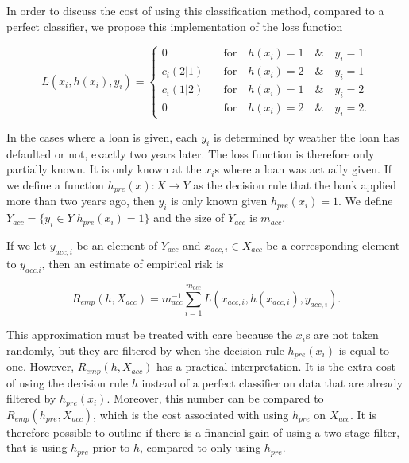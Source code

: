 \documentclass{article}
\theoremstyle{theorem}
\theoremstyle{definition}
\begin{document}
In order to discuss the cost of using this classification method, compared to a perfect classifier, we propose this implementation of the loss function

\begin{equation}
\label{def:empRiskBank}
L(x_i, h(x_i), y_i) = 
\begin{cases}
0     &\quad \mbox{for} \quad h(x_i) = 1 \quad \& \quad y_i = 1\\
c_i(2|1)    &\quad \mbox{for} \quad h(x_i) = 2 \quad \& \quad y_i = 1\\
c_i(1|2)      &\quad \mbox{for} \quad h(x_i) = 1 \quad \& \quad y_i = 2\\
0   &\quad \mbox{for} \quad h(x_i) = 2 \quad \& \quad y_i = 2.
\end{cases}
\end{equation}

In the cases where a loan is given, each $y_i$ is determined by weather the loan has defaulted or not, exactly two years later.  The loss function is therefore only partially known.  It is only known at the $x_i$s where a loan was actually given.  If we define a function $h_{pre}(x): X \rightarrow Y$ as the decision rule that the bank applied more than two years ago, then $y_i$ is only known given $h_{pre}(x_i) = 1$.  We define $Y_{acc} = \{y_i \in Y | h_{pre}(x_i) = 1\}$ and the size of $Y_{acc}$ is  $m_{acc}$.

If we let $y_{acc,i}$ be an element of $Y_{acc}$ and $x_{acc,i} \in X_{acc}$ be a corresponding element to $y_{acc.i}$, then an estimate of empirical risk is 

\begin{equation}
\label{def:empRiskLimited}
R_{emp}(h, X_{acc}) = m_{acc}^{-1} \sum_{i=1}^{m_{acc}} L(x_{acc,i}, h(x_{acc,i}), y_{acc,i}).
\end{equation}

This approximation must be treated with care because the $x_i$s are not taken randomly, but they are filtered by when the decision rule $h_{pre}(x_i)$ is equal to one.  However, $R_{emp}(h, X_{acc})$ has a practical interpretation.  It is the extra cost of using the decision rule $h$ instead of a perfect classifier on data that are already filtered by $h_{pre}(x_i)$.  Moreover, this number can be compared to $R_{emp}(h_{pre}, X_{acc})$, which is the cost associated with using $h_{pre}$ on $X_{acc}$.  It is therefore possible to outline if there is a financial gain of using a two stage filter, that is using $h_{pre}$ prior to $h$, compared to only using $h_{pre}$.
\end{document}
